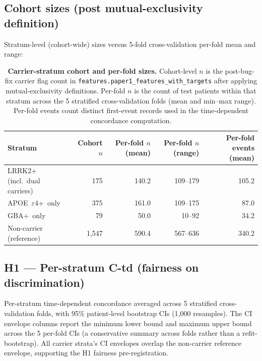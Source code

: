 \documentclass[11pt]{article}
\begin{document}
\subsection*{Cohort sizes (post mutual-exclusivity definition)}

Stratum-level (cohort-wide) sizes versus 5-fold cross-validation per-fold mean and range:

\begin{table}[h!]
\centering
\caption{\textbf{Carrier-stratum cohort and per-fold sizes.} Cohort-level $n$ is the post-bug-fix carrier flag count in \texttt{features.paper1\_features\_with\_targets} after applying mutual-exclusivity definitions. Per-fold $n$ is the count of test patients within that stratum across the 5 stratified cross-validation folds (mean and min--max range). Per-fold events count distinct first-event records used in the time-dependent concordance computation.}
\label{tab:s3_cohort}
\begin{tabular}{lrrrr}
\toprule
\textbf{Stratum} & \textbf{Cohort $n$} & \textbf{Per-fold $n$ (mean)} & \textbf{Per-fold $n$ (range)} & \textbf{Per-fold events (mean)} \\
\midrule
LRRK2+ (incl.\ dual carriers) & 175 & 140.2 & 109--179 & 105.2 \\
APOE~$\varepsilon4$+~only & 375 & 161.0 & 109--175 & 87.0 \\
GBA+~only & 79 & 50.0 & 10--92 & 34.2 \\
Non-carrier (reference) & 1{,}547 & 590.4 & 567--636 & 340.2 \\
\bottomrule
\end{tabular}
\end{table}

\subsection*{H1 — Per-stratum C-td (fairness on discrimination)}

Per-stratum time-dependent concordance averaged across 5 stratified cross-validation folds, with 95\% patient-level bootstrap CIs (1{,}000 resamples). The CI envelope columns report the minimum lower bound and maximum upper bound across the 5 per-fold CIs (a conservative summary across folds rather than a refit-bootstrap). All carrier strata's CI envelopes overlap the non-carrier reference envelope, supporting the H1 fairness pre-registration.
\end{document}
